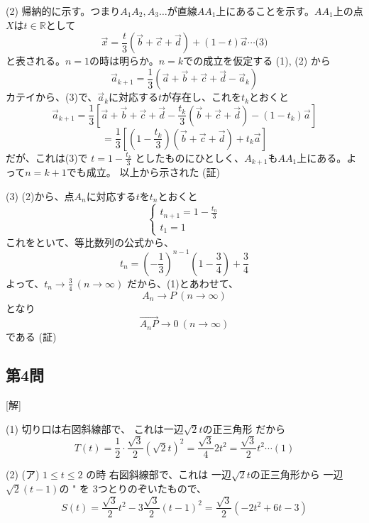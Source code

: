 \documentclass[../main.tex]{subfiles}
\begin{document}
(2) 帰納的に示す。つまり$A_1 A_2, A_3 \dots$が直線$AA_1$上にあることを示す。$AA_1$上の点$X$は$t \in \mathbb{R}$として
$$ \vec{x} = \frac{t}{3} (\vec{b} + \vec{c} + \vec{d}) + (1-t) \vec{a} \cdots \text{(3)} $$
と表される。$n=1$の時は明らか。$n=k$での成立を仮定する
(1), (2) から
$$ \vec{a}_{k+1} = \frac{1}{3} (\vec{a} + \vec{b} + \vec{c} + \vec{d} - \vec{a}_k) $$
カテイから、(3)で、$\vec{a}_k$に対応する$t$が存在し、これを$t_k$とおくと
$$ \vec{a}_{k+1} = \frac{1}{3} \left[ \vec{a} + \vec{b} + \vec{c} + \vec{d} - \frac{t_k}{3} (\vec{b} + \vec{c} + \vec{d}) - (1-t_k) \vec{a} \right] $$
$$ = \frac{1}{3} \left[ \left(1-\frac{t_k}{3}\right) (\vec{b} + \vec{c} + \vec{d}) + t_k \vec{a} \right] $$
だが、これは(3)で $t = 1 - \frac{t_k}{3}$ としたものにひとしく、$A_{k+1}$も$AA_1$上にある。よって$n=k+1$でも成立。
以上から示された (証)

(3) (2)から、点$A_n$に対応する$t$を$t_n$とおくと
$$
\begin{cases} t_{n+1} = 1 - \frac{t_n}{3} \\ t_1 = 1
\end{cases} $$
これをといて、等比数列の公式から、
$$ t_n = \left(-\frac{1}{3}\right)^{n-1} \left(1-\frac{3}{4}\right) + \frac{3}{4} $$
よって、$t_n \to \frac{3}{4} \ (n \to \infty)$ だから、(1)とあわせて、
$$ A_n \to P \ (n \to \infty) $$
となり
$$ \vec{A_n P} \to 0 \ (n \to \infty) $$
である (証)

\subsection*{第4問}
[解]

(1) 切り口は右図斜線部で、
これは一辺$\sqrt{2}t$の正三角形
だから
$$ T(t) = \frac{1}{2} \cdot \frac{\sqrt{3}}{2} (\sqrt{2}t)^2 = \frac{\sqrt{3}}{4} 2t^2 = \frac{\sqrt{3}}{2} t^2 \cdots (1) $$

\begin{center}
\end{center}

(2)
(ア) $1 \le t \le 2$ の時
右図斜線部で、これは
一辺$\sqrt{2}t$の正三角形から
一辺$\sqrt{2}(t-1)$の " を
3つとりのぞいたもので、
$$ S(t) = \frac{\sqrt{3}}{2} t^2 - 3 \frac{\sqrt{3}}{2} (t-1)^2 = \frac{\sqrt{3}}{2} (-2t^2 + 6t - 3) $$
\end{document}
